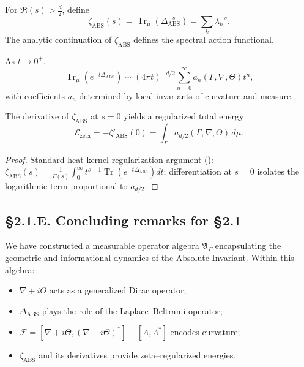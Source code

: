 \begin{definition}
For $\Re(s)>\frac{d}{2}$, define
\[
\zeta_{\mathrm{ABS}}(s)
 = \operatorname{Tr}_\mu(\Delta_{\mathrm{ABS}}^{-s})
 = \sum_k \lambda_k^{-s}.
\]
The analytic continuation of $\zeta_{\mathrm{ABS}}$ defines the spectral action functional.
\end{definition}

\begin{lemma}
As $t\to0^+$,
\[
\operatorname{Tr}_\mu(e^{-t\Delta_{\mathrm{ABS}}})
\sim (4\pi t)^{-d/2}
\sum_{n=0}^\infty a_n(\Gamma,\nabla,\Theta)t^n,
\]
with coefficients $a_n$ determined by local invariants of curvature and measure.
\end{lemma}

\begin{theorem}\label{thm:2.1.zeta}
The derivative of $\zeta_{\mathrm{ABS}}$ at $s=0$ yields a regularized total energy:
\[
\mathcal{E}_{\mathrm{zeta}}
 = -\zeta'_{\mathrm{ABS}}(0)
 = \int_\Gamma a_{d/2}(\Gamma,\nabla,\Theta)\,d\mu.
\]
\]
\end{theorem}

\begin{proof}
Standard heat kernel regularization argument (\cite{Gilkey1995}): 
$\zeta_{\mathrm{ABS}}(s)
=\frac{1}{\Gamma(s)}\int_0^\infty t^{s-1}\operatorname{Tr}(e^{-t\Delta_{\mathrm{ABS}}})dt$; differentiation at $s=0$ isolates the logarithmic term proportional to $a_{d/2}$.
\end{proof}

\subsection*{§2.1.E. Concluding remarks for §2.1}

We have constructed a measurable operator algebra $\mathfrak{A}_\Gamma$ encapsulating the geometric and informational dynamics of the Absolute Invariant.
Within this algebra:
\begin{itemize}
  \item $\nabla+i\Theta$ acts as a generalized Dirac operator;
  \item $\Delta_{\mathrm{ABS}}$ plays the role of the Laplace–Beltrami operator;
  \item $\mathcal{F}=[\nabla+i\Theta,(\nabla+i\Theta)^\ast]+[\Lambda,\Lambda^\ast]$ encodes curvature;
  \item $\zeta_{\mathrm{ABS}}$ and its derivatives provide zeta–regularized energies.
\end{itemize}

